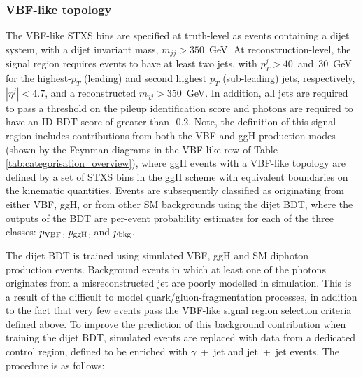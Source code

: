 \subsubsection{VBF-like topology}
The VBF-like STXS bins are specified at truth-level as events containing a dijet system, with a dijet invariant mass, $m_{jj}>350$~GeV. At reconstruction-level, the signal region requires events to have at least two jets, with $p_T^{j}>40$~and~$30$~GeV for the highest-$p_T$ (leading) and second highest $p_T$ (sub-leading) jets, respectively, $|\eta^j|<4.7$, and a reconstructed $m_{jj}>350$~GeV. In addition, all jets are required to pass a threshold on the pileup identification score and photons are required to have an ID BDT score of greater than -0.2. Note, the definition of this signal region includes contributions from both the VBF and ggH production modes (shown by the Feynman diagrams in the VBF-like row of Table \ref{tab:categorisation_overview}), where ggH events with a VBF-like topology are defined by a set of STXS bins in the ggH scheme with equivalent boundaries on the kinematic quantities. Events are subsequently classified as originating from either VBF, ggH, or from other SM backgrounds using the dijet BDT, where the outputs of the BDT are per-event probability estimates for each of the three classes: $p_{\rm{VBF}}$, $p_{\rm{ggH}}$, and $p_{\rm{bkg}}$.

The dijet BDT is trained using simulated VBF, ggH and SM diphoton production events. Background events in which at least one of the photons originates from a misreconstructed jet are poorly modelled in simulation. This is a result of the difficult to model quark/gluon-fragmentation processes, in addition to the fact that very few events pass the VBF-like signal region selection criteria defined above. To improve the prediction of this background contribution when training the dijet BDT, simulated events are replaced with data from a dedicated control region, defined to be enriched with $\gamma$~+~jet and jet~+~jet events. The procedure is as follows:

